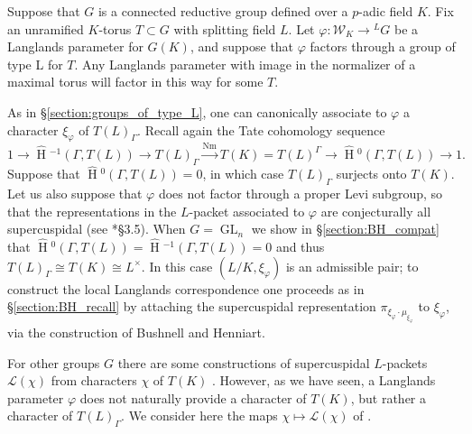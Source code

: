 \documentclass{amsart}
\theoremstyle{plain}
\newcommand{\HT}[1]{\hat{\HH}{}^{#1}}
\theoremstyle{definition}
\numberwithin{equation}{section}
\DeclareMathOperator{\HH}{H}
\DeclareMathOperator{\Nm}{Nm}
\DeclareMathOperator{\GL}{GL}
\newcommand{\Lx}{L^\times}
\newcommand{\Weil}{\mathcal{W}}
\newcommand{\Lpack}{\mathcal{L}}
\begin{document}
Suppose that $G$ is a connected reductive group defined over a
$p$-adic field $K$.  Fix an unramified $K$-torus $T \subset G$ with splitting field $L$.
Let $\varphi : \Weil_K \rightarrow {}^L G$ be a
Langlands parameter for $G(K)$, and suppose that $\varphi$ factors
through a group of type L for $T$.  Any Langlands parameter with image in the normalizer
of a maximal torus will factor in this way for some $T$.

As in \S\ref{section:groups_of_type_L}, one can canonically
associate to $\varphi$ a character $\xi_{\varphi}$ of $T(L)_{\Gamma}$.
Recall again the Tate cohomology sequence
$$1 \rightarrow \HT{-1}(\Gamma,T(L)) \rightarrow T(L)_{\Gamma} \xrightarrow{\Nm} T(K)
= T(L)^{\Gamma} \rightarrow \HT{0}(\Gamma,T(L)) \rightarrow 1.$$
Suppose that $\HT{0}(\Gamma, T(L)) = 0$, in which case
$T(L)_{\Gamma}$ surjects onto $T(K)$.  Let us also suppose that
$\varphi$ does not factor through a proper Levi subgroup, so that the
representations in the $L$-packet associated to $\varphi$ are
conjecturally all supercuspidal (see \cite{reeder-debacker:09a}*{\S 3.5}).
When $G = \GL_n$ we show in \S\ref{section:BH_compat} that
$\HT{0}(\Gamma, T(L)) = \HT{-1}(\Gamma, T(L)) = 0$ and thus
$T(L)_{\Gamma} \cong T(K) \cong \Lx$.  In this case
$(L/K, \xi_{\varphi})$ is an admissible pair; to construct the local Langlands
correspondence one proceeds as in \S\ref{section:BH_recall} by
attaching the supercuspidal representation $\pi_{\xi_{\varphi} \cdot
  \mu_{\xi_{\varphi}}}$ to $\xi_{\varphi}$, via the construction of Bushnell and Henniart.

For other groups $G$ there are some constructions of supercuspidal $L$-packets $\Lpack(\chi)$
from characters $\chi$ of $T(K)$ \cites{reeder-debacker:09a, kaletha:13a, reeder:08a}.
However, as we have seen, a Langlands parameter $\varphi$ does not naturally
provide a character of $T(K)$, but rather a character of
$T(L)_{\Gamma}$.  We consider here the maps $\chi \mapsto \Lpack(\chi)$ of \cites{reeder-debacker:09a, reeder:08a}.
\end{document}

